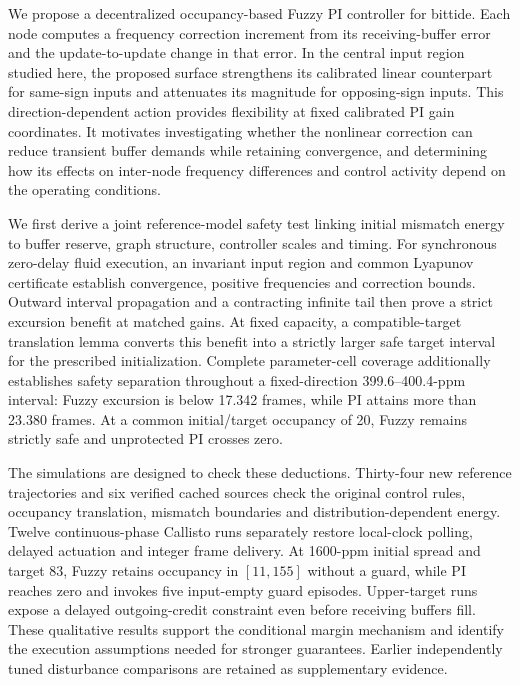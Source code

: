 We propose a decentralized occupancy-based Fuzzy PI controller for bittide. Each node computes a frequency correction increment from its receiving-buffer error and the update-to-update change in that error. In the central input region studied here, the proposed surface strengthens its calibrated linear counterpart for same-sign inputs and attenuates its magnitude for opposing-sign inputs. This direction-dependent action provides flexibility at fixed calibrated PI gain coordinates. It motivates investigating whether the nonlinear correction can reduce transient buffer demands while retaining convergence, and determining how its effects on inter-node frequency differences and control activity depend on the operating conditions.

We first derive a joint reference-model safety test linking initial mismatch energy to buffer reserve, graph structure, controller scales and timing. For synchronous zero-delay fluid execution, an invariant input region and common Lyapunov certificate establish convergence, positive frequencies and correction bounds. Outward interval propagation and a contracting infinite tail then prove a strict excursion benefit at matched gains. At fixed capacity, a compatible-target translation lemma converts this benefit into a strictly larger safe target interval for the prescribed initialization. Complete parameter-cell coverage additionally establishes safety separation throughout a fixed-direction 399.6--400.4-ppm interval: Fuzzy excursion is below 17.342 frames, while PI attains more than 23.380 frames. At a common initial/target occupancy of 20, Fuzzy remains strictly safe and unprotected PI crosses zero.

The simulations are designed to check these deductions. Thirty-four new reference trajectories and six verified cached sources check the original control rules, occupancy translation, mismatch boundaries and distribution-dependent energy. Twelve continuous-phase Callisto runs separately restore local-clock polling, delayed actuation and integer frame delivery. At 1600-ppm initial spread and target 83, Fuzzy retains occupancy in $[11,155]$ without a guard, while PI reaches zero and invokes five input-empty guard episodes. Upper-target runs expose a delayed outgoing-credit constraint even before receiving buffers fill. These qualitative results support the conditional margin mechanism and identify the execution assumptions needed for stronger guarantees. Earlier independently tuned disturbance comparisons are retained as supplementary evidence.

